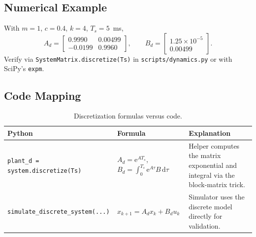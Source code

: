 \subsection{Numerical Example}
With $m=1$, $c=0.4$, $k=4$, $T_s = 5$~ms,
\[
    A_d = \begin{bmatrix} 0.9990 & 0.00499 \\ -0.0199 & 0.9960 \end{bmatrix},\qquad
    B_d = \begin{bmatrix} 1.25\times 10^{-5} \\ 0.00499 \end{bmatrix}.
\]
Verify via \texttt{SystemMatrix.discretize(Ts)} in \texttt{scripts/dynamics.py} or with SciPy's \texttt{expm}.

\subsection{Code Mapping}
\begin{table}[h]
    \centering
    \small
    \renewcommand{\arraystretch}{1.2}
    \begin{tabularx}{\linewidth}{|>{\raggedright\arraybackslash}p{4cm}|X|X|}
        \hline
        \textbf{Python} & \textbf{Formula} & \textbf{Explanation} \\
        \hline
        \texttt{plant\_d = system.discretize(Ts)} & $A_d = \mathrm{e}^{A T_s}$, $B_d = \int_{0}^{T_s} \mathrm{e}^{A \tau} B\,\mathrm{d}\tau$ & Helper computes the matrix exponential and integral via the block-matrix trick. \\
        \hline
        \texttt{simulate\_discrete\_system(...)} & $x_{k+1} = A_d x_k + B_d u_k$ & Simulator uses the discrete model directly for validation. \\
        \hline
    \end{tabularx}
    \caption{Discretization formulas versus code.}
\end{table}

